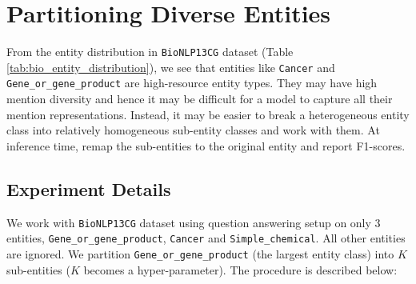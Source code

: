 \section{Partitioning Diverse Entities}
\label{sec:clustering}
From the entity distribution in \texttt{BioNLP13CG} dataset (Table \ref{tab:bio_entity_distribution}), we see that entities like \texttt{Cancer} and \texttt{Gene\_or\_gene\_product} are high-resource entity types. They may have high mention diversity and hence it may be difficult for a model to capture all their mention representations. Instead, it may be easier to break a heterogeneous entity class into relatively homogeneous sub-entity classes and work with them. At inference time, remap the sub-entities to the original entity and report F1-scores.

\subsection{Experiment Details}
We work with \texttt{BioNLP13CG} dataset using question answering setup on only 3 entities, \texttt{Gene\_or\_gene\_product}, \texttt{Cancer} and \texttt{Simple\_chemical}. All other entities are ignored. We partition \texttt{Gene\_or\_gene\_product} (the largest entity class) into $K$ sub-entities ($K$ becomes a hyper-parameter). The procedure is described below:

